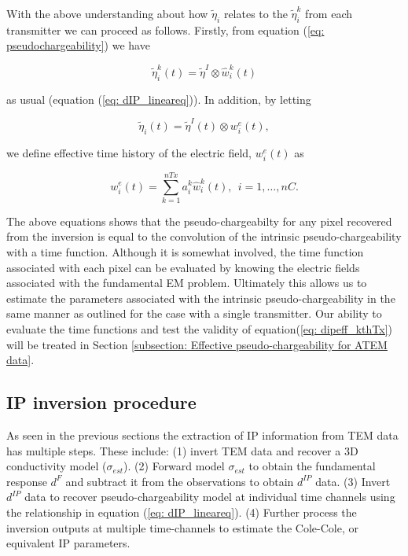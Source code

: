 \documentclass[extra,mreferee]{gji}
\newcommand{\peta}{\tilde{\eta}}
\newcommand{\dip}{d^{IP}}
\begin{document}
With the above understanding about how $\peta_i$ relates to the $\peta_i^k$ from each transmitter we can proceed  as follows. Firstly, from equation (\ref{eq: pseudochargeability}) we have 
\begin{linenomath*}
\begin{equation}
  \peta_i^k(t) =\peta^I \otimes \hat{w}^{k}_i(t) 
  \label{eq: peta_transmitters}
\end{equation}
\end{linenomath*}
as usual (equation (\ref{eq: dIP_lineareq})). 
In addition, by letting 
\begin{linenomath*}
\begin{equation}
  \peta_i(t) = \peta^I(t) \otimes w^e_i(t),
\end{equation}
\end{linenomath*}
we define effective time history of the electric field, $w^e_i(t)$ as 
\begin{linenomath*}
\begin{equation}
  w^e_i(t)= \sum_{k=1}^{nTx} a^k_i \hat{w}^{k}_i(t), \ \ i=1, \ldots, nC.
  \label{eq: we_eff}
\end{equation}
\end{linenomath*}

The above equations shows that the pseudo-chargeabilty for any pixel recovered from the inversion is equal to the convolution of the intrinsic pseudo-chargeability with a time function. Although it is somewhat involved, the time function associated with each pixel can be evaluated by knowing the electric fields associated with the fundamental EM problem. Ultimately this allows us to estimate the parameters associated with the intrinsic pseudo-chargeability in the same manner as outlined for the case with a single transmitter. Our ability to evaluate the time functions and test the validity of equation(\ref{eq: dipeff_kthTx}) will be treated in Section \ref{subsection: Effective pseudo-chargeability for ATEM data}.  


\subsection{IP inversion procedure}
As seen in the previous sections the extraction of IP information from TEM data has multiple steps. These include: (1) invert TEM data and recover a 3D conductivity model ($\sigma_{est}$). 
(2) Forward model $\sigma_{est}$ to obtain the fundamental response $d^F$ and subtract it from the observations to obtain $\dip$ data.
(3) Invert  $\dip$ data to recover pseudo-chargeability model at individual time channels using the relationship in equation (\ref{eq: dIP_lineareq}). 
(4) Further process the inversion outputs at multiple time-channels  to estimate the Cole-Cole, or equivalent IP parameters.
\end{document}
